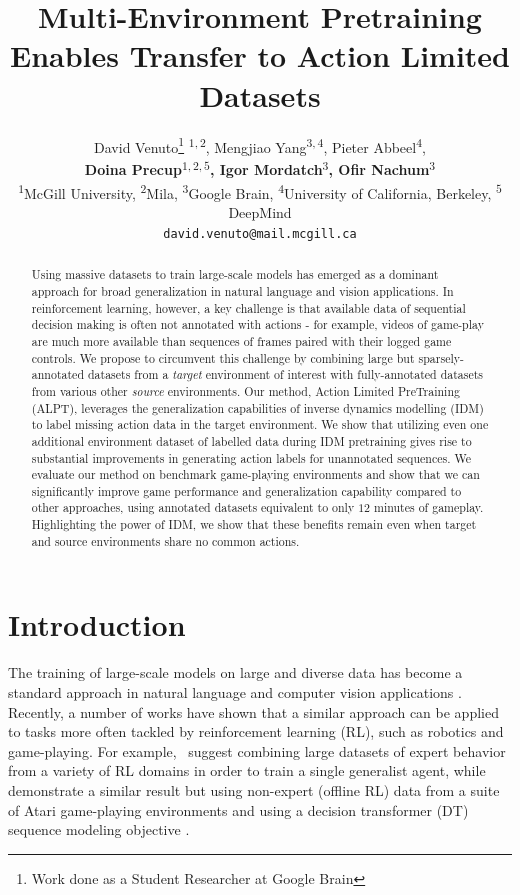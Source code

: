 \documentclass{article} %
\title{Multi-Environment Pretraining Enables Transfer to Action Limited Datasets}
\author{%
  David Venuto\thanks{Work done as a Student Researcher at Google Brain}  \textsuperscript{$1,2$}, Mengjiao Yang\textsuperscript{$3,4$}, Pieter Abbeel\textsuperscript{$4$}, \\ \textbf{Doina Precup\textsuperscript{$1,2,5$}, Igor Mordatch\textsuperscript{$3$}, Ofir Nachum\textsuperscript{$3$}} \\
  \textsuperscript{$1$}McGill University, \textsuperscript{$2$}Mila, \textsuperscript{$3$}Google Brain, \textsuperscript{$4$}University of California, Berkeley, \textsuperscript{$5$}DeepMind\\
  \texttt{david.venuto@mail.mcgill.ca}
}
\begin{document}
\maketitle

\begin{abstract}
Using massive datasets to train large-scale models has emerged as a dominant approach  for  broad  generalization  in  natural  language  and  vision  applications. In reinforcement learning, however, a key challenge is that available data of sequential decision making is often not annotated with actions - for example, videos of game-play are much more available than sequences of frames paired with their logged game controls. We propose to circumvent this challenge by combining large but sparsely-annotated datasets from a \emph{target} environment of interest with fully-annotated datasets from various other \emph{source} environments. Our method, Action Limited PreTraining (ALPT), leverages the generalization capabilities of inverse dynamics modelling (IDM) to label missing action data in the target environment. We show that utilizing even one additional environment dataset of labelled data during IDM pretraining gives rise to substantial improvements in generating action labels for unannotated sequences. We evaluate our method on benchmark game-playing environments and show that we can significantly improve game performance and generalization capability compared to other approaches, using annotated datasets equivalent to only $12$ minutes of gameplay.
Highlighting the power of IDM, we show that these benefits remain even when target and source environments share no common actions.
\end{abstract}

\section{Introduction}

The training of large-scale models on large and diverse data  has become a standard approach  in natural language and computer vision applications \citep{devlin-etal-2019-bert, NEURIPS2020_1457c0d6, DBLP:conf/eccv/MahajanGRHPLBM18, https://doi.org/10.48550/arxiv.2106.04560}. 
Recently, a number of works have shown that a similar approach can be applied to tasks more often tackled by reinforcement learning (RL), such as robotics and game-playing.
For example,~\citet{https://doi.org/10.48550/arxiv.2205.06175} suggest combining large datasets of expert behavior from a variety of RL domains in order to train a single generalist agent, while~\citet{https://doi.org/10.48550/arxiv.2205.15241} demonstrate a similar result but using non-expert (offline RL) data from a suite of Atari game-playing environments and using a decision transformer (DT) sequence modeling objective \citep{NEURIPS2021_7f489f64}.
\end{document}
